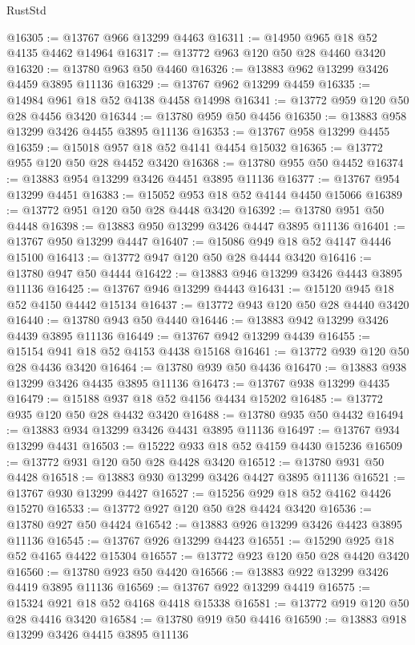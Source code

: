 \begin{lexlean}{RustStd}
\begin{coremodule}
@16305 := @13767 @966 @13299 @4463
@16311 := @14950 @965 @18 @52 @4135 @4462 @14964
@16317 := @13772 @963 @120 @50 @28 @4460 @3420
@16320 := @13780 @963 @50 @4460
@16326 := @13883 @962 @13299 @3426 @4459 @3895 @11136
@16329 := @13767 @962 @13299 @4459
@16335 := @14984 @961 @18 @52 @4138 @4458 @14998
@16341 := @13772 @959 @120 @50 @28 @4456 @3420
@16344 := @13780 @959 @50 @4456
@16350 := @13883 @958 @13299 @3426 @4455 @3895 @11136
@16353 := @13767 @958 @13299 @4455
@16359 := @15018 @957 @18 @52 @4141 @4454 @15032
@16365 := @13772 @955 @120 @50 @28 @4452 @3420
@16368 := @13780 @955 @50 @4452
@16374 := @13883 @954 @13299 @3426 @4451 @3895 @11136
@16377 := @13767 @954 @13299 @4451
@16383 := @15052 @953 @18 @52 @4144 @4450 @15066
@16389 := @13772 @951 @120 @50 @28 @4448 @3420
@16392 := @13780 @951 @50 @4448
@16398 := @13883 @950 @13299 @3426 @4447 @3895 @11136
@16401 := @13767 @950 @13299 @4447
@16407 := @15086 @949 @18 @52 @4147 @4446 @15100
@16413 := @13772 @947 @120 @50 @28 @4444 @3420
@16416 := @13780 @947 @50 @4444
@16422 := @13883 @946 @13299 @3426 @4443 @3895 @11136
@16425 := @13767 @946 @13299 @4443
@16431 := @15120 @945 @18 @52 @4150 @4442 @15134
@16437 := @13772 @943 @120 @50 @28 @4440 @3420
@16440 := @13780 @943 @50 @4440
@16446 := @13883 @942 @13299 @3426 @4439 @3895 @11136
@16449 := @13767 @942 @13299 @4439
@16455 := @15154 @941 @18 @52 @4153 @4438 @15168
@16461 := @13772 @939 @120 @50 @28 @4436 @3420
@16464 := @13780 @939 @50 @4436
@16470 := @13883 @938 @13299 @3426 @4435 @3895 @11136
@16473 := @13767 @938 @13299 @4435
@16479 := @15188 @937 @18 @52 @4156 @4434 @15202
@16485 := @13772 @935 @120 @50 @28 @4432 @3420
@16488 := @13780 @935 @50 @4432
@16494 := @13883 @934 @13299 @3426 @4431 @3895 @11136
@16497 := @13767 @934 @13299 @4431
@16503 := @15222 @933 @18 @52 @4159 @4430 @15236
@16509 := @13772 @931 @120 @50 @28 @4428 @3420
@16512 := @13780 @931 @50 @4428
@16518 := @13883 @930 @13299 @3426 @4427 @3895 @11136
@16521 := @13767 @930 @13299 @4427
@16527 := @15256 @929 @18 @52 @4162 @4426 @15270
@16533 := @13772 @927 @120 @50 @28 @4424 @3420
@16536 := @13780 @927 @50 @4424
@16542 := @13883 @926 @13299 @3426 @4423 @3895 @11136
@16545 := @13767 @926 @13299 @4423
@16551 := @15290 @925 @18 @52 @4165 @4422 @15304
@16557 := @13772 @923 @120 @50 @28 @4420 @3420
@16560 := @13780 @923 @50 @4420
@16566 := @13883 @922 @13299 @3426 @4419 @3895 @11136
@16569 := @13767 @922 @13299 @4419
@16575 := @15324 @921 @18 @52 @4168 @4418 @15338
@16581 := @13772 @919 @120 @50 @28 @4416 @3420
@16584 := @13780 @919 @50 @4416
@16590 := @13883 @918 @13299 @3426 @4415 @3895 @11136

\end{coremodule}
\end{lexlean}
